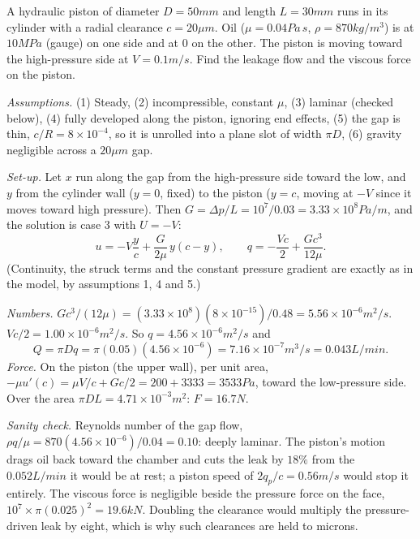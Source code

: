 \begin{example}
A hydraulic piston of diameter $D = 50\unit{mm}$ and length $L = 30\unit{mm}$ runs in its cylinder with a radial clearance $c = 20\unit{\mu m}$. Oil ($\mu = 0.04\unit{Pa\,s}$, $\rho = 870\unit{kg/m^3}$) is at $10\unit{MPa}$ (gauge) on one side and at $0$ on the other. The piston is moving toward the high-pressure side at $V = 0.1\unit{m/s}$. Find the leakage flow and the viscous force on the piston.

\emph{Assumptions.} (1) Steady, (2) incompressible, constant $\mu$, (3) laminar (checked below), (4) fully developed along the piston, ignoring end effects, (5) the gap is thin, $c/R = 8\times10^{-4}$, so it is unrolled into a plane slot of width $\pi D$, (6) gravity negligible across a $20\unit{\mu m}$ gap.

\emph{Set-up.} Let $x$ run along the gap from the high-pressure side toward the low, and $y$ from the cylinder wall ($y = 0$, fixed) to the piston ($y = c$, moving at $-V$ since it moves toward high pressure). Then $G = \Delta p/L = 10^7/0.03 = 3.33\times10^8\unit{Pa/m}$, and the solution is case 3 with $U = -V$:
\[
u = -V\frac{y}{c} + \frac{G}{2\mu}\,y(c - y), \qquad q = -\frac{Vc}{2} + \frac{Gc^3}{12\mu}.
\]
(Continuity, the struck terms and the constant pressure gradient are exactly as in the model, by assumptions 1, 4 and 5.)

\emph{Numbers.} $Gc^3/(12\mu) = (3.33\times10^8)(8\times10^{-15})/0.48 = 5.56\times10^{-6}\unit{m^2/s}$. $Vc/2 = 1.00\times10^{-6}\unit{m^2/s}$. So $q = 4.56\times10^{-6}\unit{m^2/s}$ and
\[
Q = \pi D q = \pi(0.05)(4.56\times10^{-6}) = 7.16\times10^{-7}\unit{m^3/s} = 0.043\unit{L/min}.
\]
\emph{Force.} On the piston (the upper wall), per unit area, $-\mu u'(c) = \mu V/c + Gc/2 = 200 + 3333 = 3533\unit{Pa}$, toward the low-pressure side. Over the area $\pi DL = 4.71\times10^{-3}\unit{m^2}$: $F = 16.7\unit{N}$.

\emph{Sanity check.} Reynolds number of the gap flow, $\rho q/\mu = 870(4.56\times10^{-6})/0.04 = 0.10$: deeply laminar. The piston's motion drags oil back toward the chamber and cuts the leak by $18\%$ from the $0.052\unit{L/min}$ it would be at rest; a piston speed of $2q_p/c = 0.56\unit{m/s}$ would stop it entirely. The viscous force is negligible beside the pressure force on the face, $10^7 \times \pi(0.025)^2 = 19.6\unit{kN}$. Doubling the clearance would multiply the pressure-driven leak by eight, which is why such clearances are held to microns.
\end{example}

